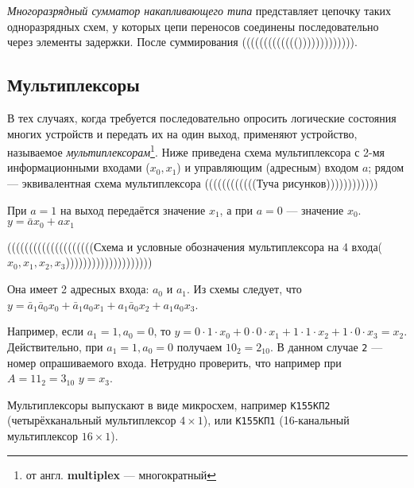 \documentclass[10pt,a4paper,titlepage]{article}
\begin{document}
\textit{Многоразрядный сумматор накапливающего типа} представляет цепочку таких одноразрядных схем, у которых цепи переносов соединены последовательно через элементы задержки.
После суммирования ((((((((((((())))))))))))).

\subsection{Мультиплексоры}
В тех случаях, когда требуется последовательно опросить логические состояния многих устройств и передать их на один выход, применяют устройство, называемое \textit{мультиплексорам}\footnote{от англ. \textbf{multiplex} --- многократный}.
Ниже приведена схема мультиплексора с 2-мя информационными входами ($x_0,x_1$) и управляющим (адресным) входом $a$; рядом --- эквивалентная схема мультиплексора ((((((((((((Туча рисунков))))))))))))

При $a=1$ на выход передаётся значение $x_1$, а при $a=0$ --- значение $x_0$.
$y=\bar ax_0+ax_1$

((((((((((((((((((((Схема и условные обозначения мультиплексора на 4 входа($x_0,x_1,x_2,x_3$))))))))))))))))))))

Она имеет 2 адресных входа: $a_0$ и $a_1$. Из схемы следует, что $y=\bar a_1\bar a_0x_0+\bar a_1a_0x_1+a_1\bar a_0x_2+a_1a_0x_3$.

Например, если $a_1=1,a_0=0$, то $y=0\cdot1\cdot x_0+0\cdot0\cdot x_1+1\cdot1\cdot x_2+1\cdot0\cdot x_3=x_2$.
Действительно, при $a_1=1,a_0=0$ получаем $10_2=2_{10}$. В данном случае \texttt{2} --- номер опрашиваемого входа.
Нетрудно проверить, что например при $A=11_2=3_{10}$ $y=x_3$.

Мультиплексоры выпускают в виде микросхем, например \texttt{К155КП2} (четырёхканальный мультиплексор $4\times1$), или \texttt{К155КП1} (16-канальный мультиплексор $16\times1$).
\end{document}
